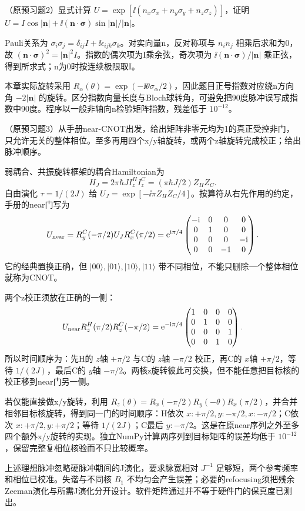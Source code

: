 \begin{exercise}
（原预习题2）显式计算 $U=\exp[\ii(n_x\sigma_x+n_y\sigma_y+n_z\sigma_z)]$，证明 $U=I\cos|\mathbf n|+\ii(\mathbf n\cdot\boldsymbol\sigma)\sin|\mathbf n|/|\mathbf n|$。
\end{exercise}
\begin{solution}
Pauli关系为 $\sigma_i\sigma_j=\delta_{ij}I+\ii\epsilon_{ijk}\sigma_k$。对实向量n，反对称项与 $n_in_j$ 相乘后求和为0，故 $(\mathbf n\cdot\boldsymbol\sigma)^2=|\mathbf n|^2I$。指数的偶次项为I乘余弦，奇次项为 $\ii(\mathbf n\cdot\boldsymbol\sigma)/|\mathbf n|$ 乘正弦，得到所求式；n为0时按连续极限取I。

本章实际旋转采用 $R_\alpha(\theta)=\exp(-\ii\theta\sigma_\alpha/2)$，因此题目正号指数对应绕n方向角 $-2|\mathbf n|$ 的旋转。区分指数向量长度与Bloch球转角，可避免把90度脉冲误写成指数中90度。程序以一般非轴向n检验矩阵指数，残差低于 $10^{-12}$。
\end{solution}

\begin{exercise}
（原预习题3）从手册near-CNOT出发，给出矩阵非零元均为1的真正受控非门，只允许无关的整体相位。至多再用四个x/y轴旋转，或两个z轴旋转完成校正；给出脉冲顺序。
\end{exercise}
\begin{solution}
弱耦合、共振旋转框架的耦合Hamiltonian为
\[H_J=2\pi\hbar JI_z^HI_z^C=(\pi\hbar J/2)Z_HZ_C.\]
自由演化 $\tau=1/(2J)$ 给 $U_J=\exp[-\ii\pi Z_HZ_C/4]$。按算符从右先作用的约定，手册的near门写为
\[
 U_{\rm near}=R_y^C(-\pi/2)U_JR_x^C(\pi/2)
 =\mathrm e^{\mathrm i\pi/4}\begin{pmatrix}
 -\mathrm i&0&0&0\\0&1&0&0\\0&0&0&-\mathrm i\\0&0&-1&0
 \end{pmatrix}.
\]
它的经典置换正确，但 $|00\rangle,|01\rangle,|10\rangle,|11\rangle$ 带不同相位，不能只删除一个整体相位就称为CNOT。

两个z校正须放在正确的一侧：
\[
 U_{\rm near}R_z^H(\pi/2)R_z^C(-\pi/2)
 =\mathrm e^{-\mathrm i\pi/4}\begin{pmatrix}
 1&0&0&0\\0&1&0&0\\0&0&0&1\\0&0&1&0
 \end{pmatrix}.
\]
所以时间顺序为：先H的 $z$轴 $+\pi/2$ 与C的 $z$轴 $-\pi/2$ 校正，再C的 $x$轴 $+\pi/2$，等待 $1/(2J)$，最后C的 $y$轴 $-\pi/2$。两核z旋转彼此可交换，但不能任意把目标核的校正移到near门另一侧。

若仅能直接做x/y旋转，利用 $R_z(\theta)=R_x(-\pi/2)R_y(-\theta)R_x(\pi/2)$，并合并相邻目标核旋转，得到同一门的时间顺序：H依次 $x:+\pi/2,y:-\pi/2,x:-\pi/2$；C依次 $x:+\pi/2,y:+\pi/2$；等待 $1/(2J)$；C最后 $y:-\pi/2$。这是在原near序列之外至多四个额外x/y旋转的实现。独立NumPy计算两序列到目标矩阵的误差均低于 $10^{-12}$，保留完整复相位核验而不只比较概率。

上述理想脉冲忽略硬脉冲期间的J演化，要求脉宽相对 $J^{-1}$ 足够短，两个参考频率和相位已校准。失谐与不同核 $B_1$ 不均匀会产生误差；必要的refocusing须把残余Zeeman演化与所需J演化分开设计。软件矩阵通过并不等于硬件门的保真度已测出。
\end{solution}


